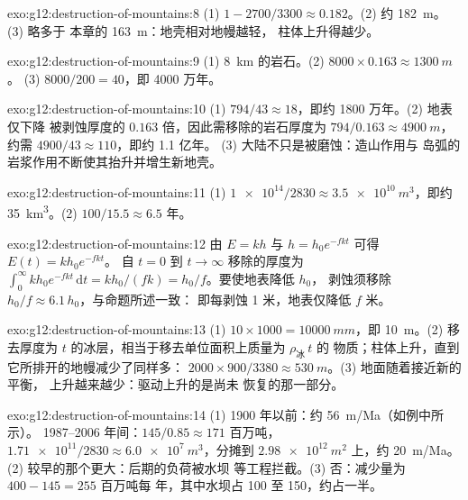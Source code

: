 \begin{solution}{exo:g12:destruction-of-mountains:8}
(1) $1 - 2700/3300 \approx 0.182$。(2) 约 \qty{182}{m}。(3) 略多于
本章的 \qty{163}{m}：地壳相对地幔越轻，
柱体上升得越少。
\end{solution}

\begin{solution}{exo:g12:destruction-of-mountains:9}
(1) \qty{8}{km} 的岩石。(2) $8000 \times 0.163 \approx \qty{1300}{m}$。
(3) $8000/200 = 40$，即 4000 万年。
\end{solution}

\begin{solution}{exo:g12:destruction-of-mountains:10}
(1) $794/43 \approx 18$，即约 1800 万年。(2) 地表仅下降
被剥蚀厚度的 $0.163$ 倍，因此需移除的岩石厚度为 $794/0.163
\approx \qty{4900}{m}$，约需 $4900/43 \approx 110$，即约 1.1 亿年。
(3) 大陆不只是被磨蚀：造山作用与
岛弧的岩浆作用不断使其抬升并增生新地壳。
\end{solution}

\begin{solution}{exo:g12:destruction-of-mountains:11}
(1) $\num{1e14}/2830 \approx \qty{3.5e10}{m^3}$，即约
\qty{35}{km^3}。(2) $100/15.5 \approx 6.5$ 年。
\end{solution}

\begin{solution}{exo:g12:destruction-of-mountains:12}
由 $E = kh$ 与 $h = h_0 e^{-fkt}$ 可得 $E(t) = kh_0 e^{-fkt}$。
自 $t = 0$ 到 $t \to \infty$ 移除的厚度为 $\int_0^{\infty} kh_0
e^{-fkt}\,\mathrm{d}t = kh_0/(fk) = h_0/f$。要使地表降低 $h_0$，
剥蚀须移除 $h_0/f \approx 6.1\,h_0$，与命题所述一致：
即每剥蚀 1 米，地表仅降低 $f$ 米。
\end{solution}

\begin{solution}{exo:g12:destruction-of-mountains:13}
(1) $10 \times 1000 = \qty{10000}{mm}$，即 \qty{10}{m}。(2) 移去厚度为
$t$ 的冰层，相当于移去单位面积上质量为 $\rho_{\text{冰}}\,t$ 的
物质；柱体上升，直到它所排开的地幔减少了同样多：
$2000 \times 900/3380 \approx \qty{530}{m}$。(3) 地面随着接近新的平衡，
上升越来越少：驱动上升的是尚未
恢复的那一部分。
\end{solution}

\begin{solution}{exo:g12:destruction-of-mountains:14}
(1) 1900 年以前：约 \qty{56}{m/Ma}（如例中所示）。
1987--2006 年间：$145/0.85 \approx 171$ 百万吨，$\num{1.71e11}/2830
\approx \qty{6.0e7}{m^3}$，分摊到 $\qty{2.98e12}{m^2}$ 上，约
\qty{20}{m/Ma}。(2) 较早的那个更大：后期的负荷被水坝
等工程拦截。(3) 否：减少量为 $400 - 145 = 255$ 百万吨每
年，其中水坝占 100 至 150，约占一半。
\end{solution}

